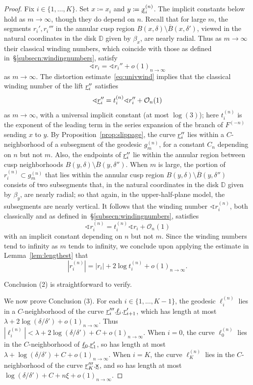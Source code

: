 \documentclass{amsart}
\newcommand\ID{{\mathbb{D}}}
\theoremstyle{definition}
\theoremstyle{remark}
\newcommand{\sfx}{{\sf x}}
\begin{document}
\begin{proof}
Fix $i\in \{1, \ldots, K\}$.  Set $x\coloneqq x_i$ and $y\coloneqq\undertilde{x}_i^{(n)}$.  The implicit constants below hold as $m\to\infty$, though they do depend on $n$. Recall  that for large $m$, the segments $r_i', r_i'''$ in the annular cusp region $B(x, \delta) \setminus \overline{B}(x,\delta')$, viewed in the natural coordinates in the disk $\ID$ given by $\beta_x$, are nearly radial.  Thus as $m\to\infty$ their classical winding numbers, which coincide with those as defined in~\S\ref{subsecn:windingnumbers}, satisfy 
\[ \sphericalangle r_i=\sphericalangle r_i'' + o(1)_{n\to\infty}\]
as $m\to\infty$.   The distortion estimate~\eqref{eq:univwind} implies that the classical winding number of the lift $ \undertilde{r}_i''$ satisfies 
\[ \sphericalangle \undertilde{r}_i''=t^{(n)}_i\sphericalangle r_i''+\mathcal O_n(1)\]
as $m\to\infty$, with a universal implicit constant (at most $\log(3)$); here $t^{(n)}_i$ is the exponent of the leading term in the series expansion of the branch of $F^{(-n)}$ sending $x$ to $y$.   
  By Proposition~\ref{prop:slippage}, the curve $\undertilde{r}_i''$ lies within a $C$-neighborhood of  a subsegment of the geodesic $g_m^{(n)}$, for a constant $C_n$ depending on $n$ but not $m$.  Also, the endpoints of $\undertilde{r}_i''$ lie within the annular region between cusp neighborhoods $B(y, \delta) \setminus \overline{B}(y,\delta'')$.  When $m$ is large, the portion of $r_i^{(n)}\subset g_m^{(n)}$  that lies within the annular cusp region $B(y, \delta) \setminus \overline{B}(y,\delta'')$ consists of two  subsegments that, in the natural coordinates in the disk $\ID$ given by $\beta_y$, are nearly radial; so that again, in the upper-half-plane model, the subsegments are nearly vertical.  It follows  that the winding number $\sphericalangle r_i^{(n)}$, both classically and as defined in~\S\ref{subsecn:windingnumbers}, satisfies 
\[ \sphericalangle r_i^{(n)}=t^{(n)}_i \sphericalangle r_i + \mathcal O_n(1)\]
with an implicit constant depending on $n$ but not $m$. 
Since the winding numbers tend to infinity as $m$ tends to infinity, we conclude upon applying the estimate in Lemma~\ref{lem:lengthest}  that 
\[ |r_i^{(n)}| = |r_i| + 2\log t^{(n)}_i + o(1)_{n\to\infty}.\]

Conclusion (2) is straightforward to verify.

We now prove Conclusion (3). For each $i\in \{1, \ldots, K-1\}$, the geodesic $\ell_i^{(n)}$ lies in a $C$-neighborhood of the curve $\undertilde{r}_{i}'''.\undertilde{\ell}_i.\undertilde{r}_{i+1}'$, which has length at most $\lambda+2\log(\delta/\delta')+o(1)_{n\to\infty}$.  Thus $|\ell_i^{(n)}| < \lambda+2\log(\delta/\delta')+C+o(1)_{n\to\infty}$.  When $i=0$, the curve $\ell_0^{(n)}$ lies in the $C$-neighborhood of $\undertilde{\ell}_0.\undertilde{r}_1'$, so has length at most $\lambda+\log(\delta/\delta')+C+o(1)_{n\to\infty}$.  When $i=K$, the curve $\ell_K^{(n)}$ lies in the $C$-neighborhood of the curve $\undertilde{r}_K'''.\undertilde{\sfx}$, and so has length at most $\log(\delta/\delta')+C+n\xi+o(1)_{n\to\infty}$. 
\end{proof}
\end{document}
